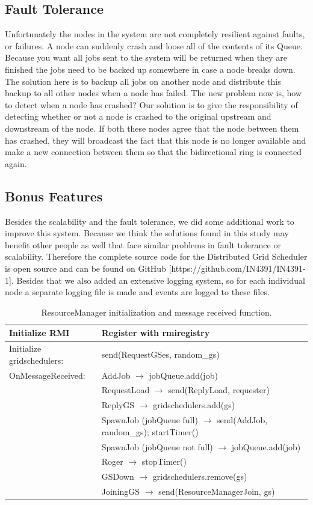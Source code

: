 \documentclass[twocolumn,a4paper]{article}
\begin{document}
\subsection{Fault Tolerance}
Unfortunately the nodes in the system are not completely resilient against faults, or failures. A node can suddenly crash and loose all of the contents of its Queue. Because you want all jobs sent to the system will be returned when they are finished the jobs need to be backed up somewhere in case a node breaks down. The solution here is to backup all jobs on another node and distribute this backup to all other nodes when a node has failed. The new problem now is, how to detect when a node has crashed? Our solution is to give the responsibility of detecting whether or not a node is crashed to the original upstream and downstream of the node. If both these nodes agree that the node between them has crashed, they will broadcast the fact that this node is no longer available and make a new connection between them so that the bidirectional ring is connected again.

\subsection{Bonus Features}
Besides the scalability and the fault tolerance, we did some additional work to improve this system. Because we think the solutions found in this study may benefit other people as well that face similar problems in fault tolerance or scalability. Therefore the complete source code for the Distributed Grid Scheduler is open source and can be found on GitHub [https://github.com/IN4391/IN4391-1]. Besides that we also added an extensive logging system, so for each individual node a separate logging file is made and events are logged to these files.

\begin{table}
\begin{tabular}{ |l|l| }
  \hline
  Initialize RMI & Register with rmiregistry \\
  \hline
  Initialize gridschedulers: & send(RequestGSes, random\_gs) \\
  \hline
  OnMessageReceived: & AddJob $\rightarrow$ jobQueue.add(job) \\
  & RequestLoad $\rightarrow$ send(ReplyLoad, requester) \\
  & ReplyGS $\rightarrow$ gridschedulers.add(gs) \\
  & SpawnJob (jobQueue full) $\rightarrow$ send(AddJob, random\_gs); startTimer() \\
  & SpawnJob (jobQueue not full) $\rightarrow$ jobQueue.add(job) \\
  & Roger $\rightarrow$ stopTimer() \\
  & GSDown $\rightarrow$  gridschedulers.remove(gs) \\
  & JoiningGS $\rightarrow$ send(ResourceManagerJoin, gs) \\
  \hline
\end{tabular}
\caption{ResourceManager initialization and message received function.}
\end{table}
\end{document}
